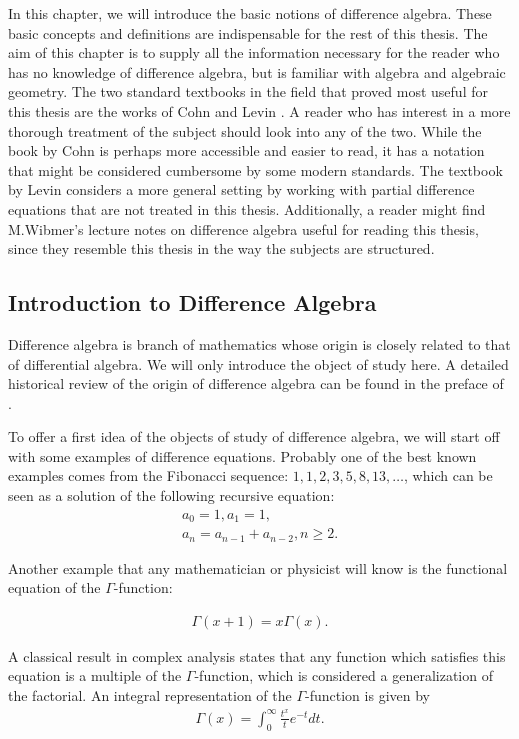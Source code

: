 In this chapter, we will introduce the basic notions of difference algebra. These basic concepts and definitions are indispensable for the rest of this thesis. 
The aim of this chapter is to supply all the information necessary for the reader who has no knowledge of difference algebra, but is familiar with algebra and algebraic geometry. 
The two standard textbooks in the field that proved most useful for this thesis are the works of Cohn \cite{cohn} and Levin \cite{levin}. 
A reader who has interest in a more thorough treatment of the subject should look into any of the two. While the book by Cohn is perhaps more accessible and easier to read, 
it has a notation that might be considered cumbersome by some modern standards. The textbook by Levin considers a more general setting by working with partial difference equations that are not treated in this thesis.
Additionally, a reader might find M.Wibmer's lecture notes on difference algebra \cite{wibmer} useful for reading this thesis, since they resemble this thesis in the way the subjects are structured.

\subsection{Introduction to Difference Algebra} 


Difference algebra is branch of mathematics whose origin is closely related to that of differential algebra. 
We will only introduce the object of study here. A detailed historical review of the origin of difference algebra can be found in the preface of \cite{levin}. 

To offer a first idea of the objects of study of difference algebra, we will start off with some examples of difference equations. Probably one of the best known examples comes from the Fibonacci sequence: $1,1,2,3,5,8,13,\ldots$, which can be seen as a solution of the following recursive equation:
\begin{align*}
a_0 = 1,  a_1 = 1, \\ a_n = a_{n-1} + a_{n-2}, n\geq 2.
\end{align*}

Another example that any mathematician or physicist will know is the functional equation of the $\Gamma$-function:

\begin{align*}
\Gamma(x+1) = x \Gamma(x).
\end{align*}

A classical result in complex analysis states that any function which satisfies this equation is a multiple of the $\Gamma$-function,
which is considered a generalization of the factorial. An integral representation of the $\Gamma$-function is given by
\begin{align*}
\Gamma(x) = \int_0^\infty{\frac{t^x}{t} e^{-t} dt}.
\end{align*}

